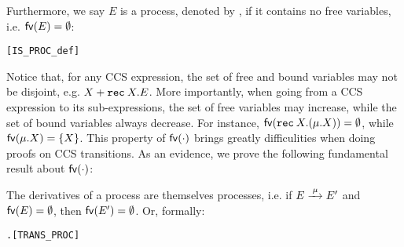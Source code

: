 Furthermore, we say $E$ is a process, denoted by , if
it contains no free variables, i.e. ${{\rm\sf{fv}}}(E) = \emptyset$:
\begin{alltt}
     \HOLSymConst{\HOLTokenDefEquality{}}   \HOLSymConst{\ensuremath{=}} \HOLSymConst{\HOLTokenEmpty{}}\hfill{[IS_PROC_def]}
\end{alltt}

Notice that, for any CCS expression, the set of free and bound
variables may not be disjoint, e.g. $X + {\tt rec}\: X . E$.
More importantly, when going
from a CCS expression to its sub-expressions, the set of free
variables may increase, while the set of bound variables always
decrease. For instance, ${{\rm\sf{fv}}}({\tt rec}\: X . (\mu.X)) = \emptyset$, while
${{\rm\sf{fv}}}(\mu.X) = \{X\}$. This property of ${{\rm\sf{fv}}}(\cdot)$ brings greatly
difficulities when doing proofs on CCS transitions. As an evidence,
we prove the following fundamental result about ${{\rm\sf{fv}}}(\cdot)$:

\begin{proposition}
\label{prop:transFV}
The derivatives of a process are themselves processes, i.e.
if $E \arr{\mu} E'$ and ${{\rm\sf{fv}}}(E) = \emptyset$, then ${{\rm\sf{fv}}}(E') =
\emptyset$. Or, formally:
\begin{alltt}
\HOLTokenTurnstile{} \HOLSymConst{\HOLTokenForall{}}  .  \HOLTokenTransBegin{}\HOLTokenTransEnd {} \HOLSymConst{\HOLTokenConj{}}   \HOLSymConst{\HOLTokenImp{}}  \hfill{[TRANS_PROC]}
\end{alltt}
\end{proposition}

